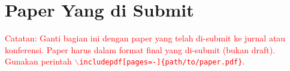 \section{Paper Yang di Submit}

% 

\textcolor{red}{Catatan: Ganti bagian ini dengan paper yang telah di-submit ke jurnal atau konferensi. Paper harus dalam format final yang di-submit (bukan draft). Gunakan perintah \texttt{$\backslash$includepdf[pages=-]\{path/to/paper.pdf\}}.}
